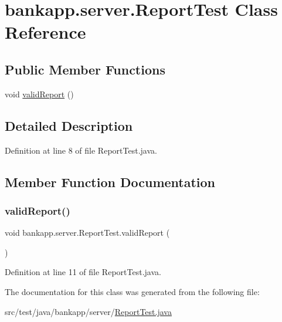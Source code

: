 \hypertarget{classbankapp_1_1server_1_1_report_test}{}\section{bankapp.\+server.\+Report\+Test Class Reference}
\label{classbankapp_1_1server_1_1_report_test}
\subsection*{Public Member Functions}
\begin{DoxyCompactItemize}
\item 
void \hyperlink{classbankapp_1_1server_1_1_report_test_ac631ce96a74a2e822f53d5b636414750}{valid\+Report} ()
\end{DoxyCompactItemize}


\subsection{Detailed Description}


Definition at line 8 of file Report\+Test.\+java.



\subsection{Member Function Documentation}
\mbox{\label{classbankapp_1_1server_1_1_report_test_ac631ce96a74a2e822f53d5b636414750}} 
\subsubsection{\texorpdfstring{valid\+Report()}{validReport()}}
{\footnotesize\ttfamily void bankapp.\+server.\+Report\+Test.\+valid\+Report (\begin{DoxyParamCaption}{ }\end{DoxyParamCaption})}



Definition at line 11 of file Report\+Test.\+java.



The documentation for this class was generated from the following file\+:\begin{DoxyCompactItemize}
\item 
src/test/java/bankapp/server/\hyperlink{_report_test_8java}{Report\+Test.\+java}\end{DoxyCompactItemize}
